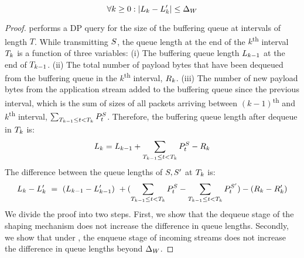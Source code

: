 {\begin{lemma}
\begin{equation}\label{equ:composition}
        \forall k \geq 0 : |L_{k} - L_{k}'| \leq \Delta_{W}
\end{equation}
\end{lemma}
\begin{proof}
{\sys} performs a DP query for the size of the buffering queue at intervals of
length $T$.
While transmitting $S$, the queue length at the end of the
$k$\textsuperscript{th} interval $T_{k}$ is a function of three
variables:
%
(i) The buffering queue length $L_{k-1}$ at the end of
$T_{k-1}$.
%
(ii) The total number of payload bytes that have been dequeued from the
buffering queue in the $k$\textsuperscript{th} interval,
${R}_{k}$.
%
(iii) The number of new payload bytes from the application stream added
to the buffering queue since the previous interval, which is the sum of
sizes of all packets arriving between $(k-1)$\textsuperscript{th} and
$k$\textsuperscript{th} interval, \ie
$\sum_{T_{k-1} \leq t < T_{k}} P^S_t$.
%
%
Therefore, the buffering queue length after dequeue in $T_{k}$ is:
\begin{equation}\label{equ:queue-state}
L_{k} = {L_{k-1}} +
{\sum_{T_{k-1} \leq t < T_{k}} P^S_t}
-
{{R}_{k}}
\end{equation}
The difference between the queue lengths of
$S, S'$ at $T_{k}$ is:
{\footnotesize
\begin{equation}\label{equ:queue_state_expansion}
L_{k} - L_{k}'~=~(L_{k-1} - L_{k-1}')~+ (\sum_{T_{k-1} \leq t < T_{k}}P^S_t - \sum_{T_{k-1} \leq t < T_{k}}P^{S'}_t) - ({R}_{k} - {R}_{k}')
\end{equation}}
We divide the proof into two steps.
First, we show that the dequeue stage of the shaping mechanism does not increase the difference in queue lengths.
Secondly, we show that under , the enqueue stage of incoming streams does not increase the difference in queue lengths beyond $\Delta_{W}$.


\end{proof}}
